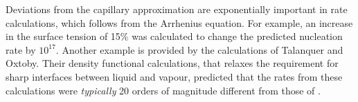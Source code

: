 %

Deviations from the capillary approximation are exponentially important in rate calculations,
which follows from the Arrhenius equation.
For example, an increase in the surface tension of 15\%
was calculated\cite{Kiang1971} to change the predicted nucleation rate by $10^{17}$.
Another example is provided by the calculations of Talanquer and Oxtoby\cite{Talanquer1995, Oxtoby1988}.
Their  density functional calculations, that relaxes the requirement for sharp interfaces between liquid and vapour,
predicted that the rates  from these  calculations were  {\em typically}   20 orders of magnitude different from those of \cnt.



